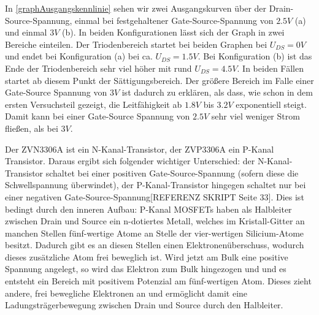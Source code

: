 \documentclass[11pt, a4paper]{article}
\begin{document}
In \autoref{graphAusgangskennlinie} sehen wir zwei Ausgangskurven über der Drain-Source-Spannung, einmal bei festgehaltener Gate-Source-Spannung von $2.5V$ (a) und einmal $3V$ (b). In beiden Konfigurationen lässt sich der Graph in zwei Bereiche einteilen. Der Triodenbereich startet bei beiden Graphen bei $U_{DS} = 0 V$ und endet bei Konfiguration (a) bei ca. $U_{DS} = 1.5 V$. Bei Konfiguration (b) ist das Ende der Triodenbereich sehr viel höher mit rund $U_{DS} = 4.5 V$. In beiden Fällen startet ab diesem Punkt der Sättigungsbereich. Der größere Bereich im Falle einer Gate-Source Spannung von $3 V$ ist dadurch zu erklären, als dass, wie schon in dem ersten Versuchsteil gezeigt, die Leitfähigkeit ab $1.8 V$ bis $3.2 V$ exponentiell steigt. Damit kann bei einer Gate-Source Spannung von $2.5 V$ sehr viel weniger Strom fließen, als bei $3 V$.


Der ZVN3306A ist ein N-Kanal-Transistor, der ZVP3306A ein P-Kanal Transistor. Daraus ergibt sich folgender wichtiger Unterschied: der N-Kanal-Transistor schaltet bei einer positiven Gate-Source-Spannung (sofern diese die Schwellspannung überwindet), der P-Kanal-Transistor hingegen schaltet nur bei einer negativen Gate-Source-Spannung[REFERENZ SKRIPT Seite 33]. Dies ist bedingt durch den inneren Aufbau:
P-Kanal MOSFETs haben als Halbleiter zwischen Drain und Source ein n-dotiertes Metall, welches im Kristall-Gitter an manchen Stellen fünf-wertige Atome an Stelle der vier-wertigen Silicium-Atome besitzt. Dadurch gibt es an diesen Stellen einen Elektronenüberschuss, wodurch dieses zusätzliche Atom frei beweglich ist. Wird jetzt am Bulk eine positive Spannung angelegt, so wird das Elektron zum Bulk hingezogen und und es entsteht ein Bereich mit positivem Potenzial am fünf-wertigen Atom. Dieses zieht andere, frei bewegliche Elektronen an und ermöglicht damit eine Ladungsträgerbewegung zwischen Drain und Source durch den Halbleiter.
\end{document}
